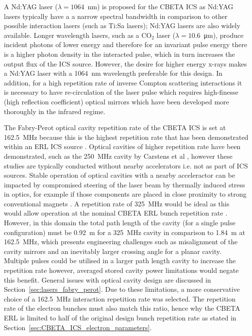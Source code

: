 \documentclass[../main.tex]{subfiles}
\begin{document}
A Nd:YAG laser ($\lambda = 1064$~\si{\nano\meter}) is proposed for the CBETA ICS as Nd:YAG lasers typically have a a narrow spectral bandwidth in comparison to other possible interaction lasers (such as Ti:Sa lasers); Nd:YAG lasers are also widely available. Longer wavelength lasers, such as a CO$_{2}$ laser \cite{pogorelsky2020converting} ($\lambda = 10.6$~\si{\micro\meter}), produce incident photons of lower energy and therefore for an invariant pulse energy there is a higher photon density in the interacted pulse, which in turn increases the output flux of the ICS source. However, the desire for higher energy x-rays makes a Nd:YAG laser with a 1064~\si{\nano\meter} wavelength preferable for this design. In addition, for a high repetition rate of inverse Compton scattering interactions it is necessary to have re-circulation of the laser pulse which requires high-finesse (high reflection coefficient) optical mirrors which have been developed more thoroughly in the infrared regime. 

The Fabry-Perot optical cavity repetition rate of the CBETA ICS is set at 162.5~\si{\mega\hertz} because this is the highest repetition rate that has been demonstrated within an ERL ICS source \cite{akagi2016narrow}. Optical cavities of higher repetition rate have been demonstrated, such as the 250~\si{\mega\hertz} cavity by Carstens et al \cite{carstens2014megawatt}, however these studies are typically conducted without nearby accelerators i.e. not as part of ICS sources. Stable operation of optical cavities with a nearby acceleractor can be impacted by compromised steering of
the laser beam by thermally induced
stress in optics, for example if those components are placed in close
proximity to strong conventional magnets \cite{gunther2019device}. A repetition rate of 325~\si{\mega\hertz} would be ideal as this would allow operation at the nominal CBETA ERL bunch repetition rate \cite{hoffstaetter2017cbeta}. However, in this domain the total path length of the cavity (for a single pulse configuration) must be 0.92~\si{\meter} for a 325~\si{\mega\hertz} cavity in comparison to 1.84~\si{\meter} at 162.5~\si{\mega\hertz}, which presents engineering challenges such as misalignment of the cavity mirrors and an inevitably larger crossing angle for a planar cavity. Multiple pulses could be utilised in a larger path length cavity to increase the repetition rate however, averaged stored cavity power limitations would negate this benefit. General issues with optical cavity design are discussed in Section~\ref{sec:lasers_fabry_perot}. Due to these limitations, a more conservative choice of a 162.5~\si{\mega\hertz} interaction repetition rate was selected. The repetition rate of the electron bunches must also match this ratio, hence why the CBETA ERL is limited to half of the original design bunch repetition rate as stated in Section~\ref{sec:CBETA_ICS_electron_parameters}. 
\end{document}
